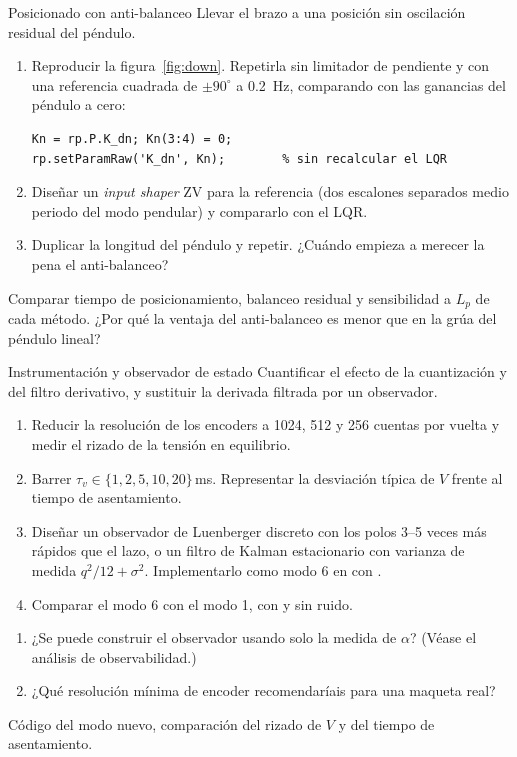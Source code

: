 \label{pr:down}
\begin{practica}{Posicionado con anti-balanceo}
\objetivos Llevar el brazo a una posición sin oscilación residual del péndulo.
\procedimiento
\begin{enumerate}
  \item Reproducir la figura~\ref{fig:down}. Repetirla sin limitador de pendiente y con una referencia cuadrada de $\pm90^\circ$ a \SI{0.2}{Hz}, comparando con las ganancias del péndulo a cero:
\begin{lstlisting}
Kn = rp.P.K_dn; Kn(3:4) = 0;
rp.setParamRaw('K_dn', Kn);        % sin recalcular el LQR
\end{lstlisting}
  \item Diseñar un \emph{input shaper} ZV para la referencia (dos escalones separados medio periodo del modo pendular) y compararlo con el LQR.
  \item Duplicar la longitud del péndulo y repetir. ¿Cuándo empieza a merecer la pena el anti-balanceo?
\end{enumerate}
\preguntas Comparar tiempo de posicionamiento, balanceo residual y sensibilidad a $L_p$ de cada método. ¿Por qué la ventaja del anti-balanceo es menor que en la grúa del péndulo lineal?
\end{practica}

\label{pr:obs}
\begin{practica}{Instrumentación y observador de estado}
\objetivos Cuantificar el efecto de la cuantización y del filtro derivativo, y sustituir la derivada filtrada por un observador.
\procedimiento
\begin{enumerate}
  \item Reducir la resolución de los encoders a 1024, 512 y 256 cuentas por vuelta y medir el rizado de la tensión en equilibrio.
  \item Barrer $\tau_v\in\{1,2,5,10,20\}$\,ms. Representar la desviación típica de $V$ frente al tiempo de asentamiento.
  \item Diseñar un observador de Luenberger discreto con los polos 3--5 veces más rápidos que el lazo, o un filtro de Kalman estacionario con varianza de medida $q^2/12+\sigma^2$. Implementarlo como modo 6 en  con .
  \item Comparar el modo 6 con el modo 1, con y sin ruido.
\end{enumerate}
\preguntas
\begin{enumerate}
  \item ¿Se puede construir el observador usando solo la medida de $\alpha$? (Véase el análisis de observabilidad.)
  \item ¿Qué resolución mínima de encoder recomendaríais para una maqueta real?
\end{enumerate}
\entregables Código del modo nuevo, comparación del rizado de $V$ y del tiempo de asentamiento.
\end{practica}
